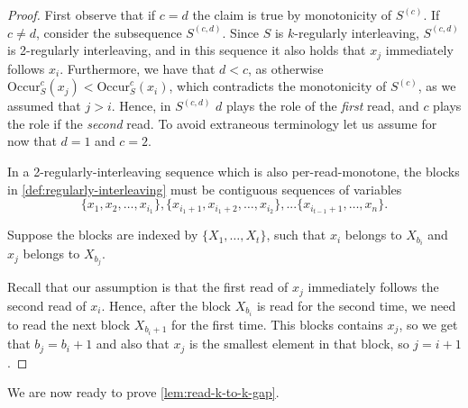 \documentclass[11pt]{article}
\newcommand{\occur}[3]{\mathrm{Occur}_{#1}^{#2}({#3})}
\begin{document}
\begin{proof}
First observe that if $c=d$ the claim is true by monotonicity of $S^{(c)}$. If $c \neq d$, consider the subsequence $S^{(c,d)}$. Since $S$ is $k$-regularly interleaving, $S^{(c,d)}$ is 2-regularly interleaving, and in this sequence it also holds that $x_j$ immediately follows $x_i$. Furthermore, we have that $d < c$, as otherwise $\occur{S}{c}{x_j} < \occur{S}{c}{x_i}$, which contradicts the monotonicity of $S^{(c)}$, as we assumed that $j>i$. Hence, in $S^{(c,d)}$ $d$ plays the role of the {\em first} read, and $c$ plays the role if the {\em second} read. To avoid extraneous terminology let us assume for now that $d=1$ and $c=2$.

In a 2-regularly-interleaving sequence which is also per-read-monotone, the blocks in \autoref{def:regularly-interleaving} must be contiguous sequences of variables 
\[
\{x_1, x_2, \ldots, x_{i_1}\}, \{x_{i_1+1}, x_{i_1+2}, \ldots, x_{i_2}\}, ... \{x_{i_{t-1}+1}, \ldots, x_n\}.
\]

Suppose the blocks are indexed by $\{X_1, \ldots, X_t\}$, such that $x_i$ belongs to $X_{b_i}$ and $x_j$ belongs to $X_{b_j}$.

Recall that our assumption is that the first read of $x_j$ immediately follows the second read of $x_i$. Hence, after the block $X_{b_i}$ is read for the second time, we need to read the next block $X_{b_i+1}$ for the first time. This blocks contains $x_j$, so we get that $b_j=b_i+1$ and also that $x_j$ is the smallest element in that block, so $j=i+1$. 
\end{proof}


We are now ready to prove \autoref{lem:read-k-to-k-gap}. 
\end{document}
